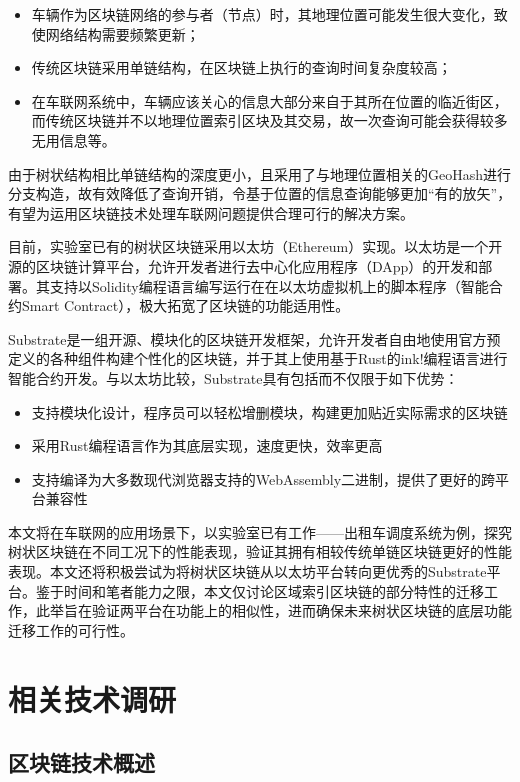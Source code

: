 \begin{itemize}
  \item 车辆作为区块链网络的参与者（节点）时，其地理位置可能发生很大变化，致使网络结构需要频繁更新；
  \item 传统区块链采用单链结构，在区块链上执行的查询时间复杂度较高；
  \item 在车联网系统中，车辆应该关心的信息大部分来自于其所在位置的临近街区，而传统区块链并不以地理位置索引区块及其交易，故一次查询可能会获得较多无用信息等。
\end{itemize}

由于树状结构相比单链结构的深度更小，且采用了与地理位置相关的GeoHash进行分支构造，故有效降低了查询开销，令基于位置的信息查询能够更加“有的放矢”，有望为运用区块链技术处理车联网问题提供合理可行的解决方案。

目前，实验室已有的树状区块链采用以太坊（Ethereum）实现。以太坊是一个开源的区块链计算平台，允许开发者进行去中心化应用程序（DApp）的开发和部署。其支持以Solidity编程语言编写运行在在以太坊虚拟机上的脚本程序（智能合约Smart Contract），极大拓宽了区块链的功能适用性。

Substrate是一组开源、模块化的区块链开发框架，允许开发者自由地使用官方预定义的各种组件构建个性化的区块链，并于其上使用基于Rust的ink!编程语言进行智能合约开发。与以太坊比较，Substrate具有包括而不仅限于如下优势：

\begin{itemize}
  \item 支持模块化设计，程序员可以轻松增删模块，构建更加贴近实际需求的区块链
  \item 采用Rust编程语言作为其底层实现，速度更快，效率更高
  \item 支持编译为大多数现代浏览器支持的WebAssembly二进制，提供了更好的跨平台兼容性
\end{itemize}

本文将在车联网的应用场景下，以实验室已有工作——出租车调度系统为例，探究树状区块链在不同工况下的性能表现，验证其拥有相较传统单链区块链更好的性能表现。本文还将积极尝试为将树状区块链从以太坊平台转向更优秀的Substrate平台。鉴于时间和笔者能力之限，本文仅讨论区域索引区块链的部分特性的迁移工作，此举旨在验证两平台在功能上的相似性，进而确保未来树状区块链的底层功能迁移工作的可行性。

\section{相关技术调研}

\subsection{区块链技术概述}

